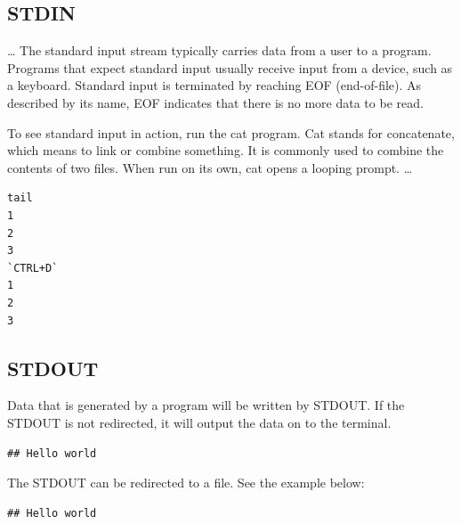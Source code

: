 \documentclass[]{book}
\makeatletter
\newenvironment{Shaded}{\begin{snugshade}}{\end{snugshade}}
\newcommand{\StringTok}[1]{\textcolor[rgb]{0.31,0.60,0.02}{#1}}
\newcommand{\CommentTok}[1]{\textcolor[rgb]{0.56,0.35,0.01}{\textit{#1}}}
\newcommand{\FunctionTok}[1]{\textcolor[rgb]{0.00,0.00,0.00}{#1}}
\newcommand{\VariableTok}[1]{\textcolor[rgb]{0.00,0.00,0.00}{#1}}
\newcommand{\OperatorTok}[1]{\textcolor[rgb]{0.81,0.36,0.00}{\textbf{#1}}}
\newcommand{\BuiltInTok}[1]{#1}
\newcommand{\NormalTok}[1]{#1}
\newenvironment{kframe}{%
\medskip{}
\setlength{\fboxsep}{.8em}
 \def\at@end@of@kframe{}%
 \ifinner\ifhmode%
  \def\at@end@of@kframe{\end{minipage}}%
  \begin{minipage}{\columnwidth}%
 \fi\fi%
 \def\FrameCommand##1{\hskip\@totalleftmargin \hskip-\fboxsep
 \colorbox{shadecolor}{##1}\hskip-\fboxsep
     \hskip-\linewidth \hskip-\@totalleftmargin \hskip\columnwidth}%
 \MakeFramed {\advance\hsize-\width
   \@totalleftmargin\z@ \linewidth\hsize
   \@setminipage}}%
 {\par\unskip\endMakeFramed%
 \at@end@of@kframe}
\renewenvironment{Shaded}{\begin{kframe}}{\end{kframe}}
\theoremstyle{definition}
\theoremstyle{definition}
\theoremstyle{definition}
\theoremstyle{remark}
\makeatother
\begin{document}
\subsection{STDIN}\label{stdin}

\ldots{} The standard input stream typically carries data from a user to
a program. Programs that expect standard input usually receive input
from a device, such as a keyboard. Standard input is terminated by
reaching EOF (end-of-file). As described by its name, EOF indicates that
there is no more data to be read.

To see standard input in action, run the cat program. Cat stands for
concatenate, which means to link or combine something. It is commonly
used to combine the contents of two files. When run on its own, cat
opens a looping prompt. \ldots{}

\begin{verbatim}
tail
1
2
3
`CTRL+D`
1
2
3
\end{verbatim}

\subsection{STDOUT}\label{stdout}

Data that is generated by a program will be written by STDOUT. If the
STDOUT is not redirected, it will output the data on to the terminal.

\begin{Shaded}
\end{Shaded}

\begin{verbatim}
## Hello world
\end{verbatim}

The STDOUT can be redirected to a file. See the example below:

\begin{Shaded}
\end{Shaded}

\begin{verbatim}
## Hello world
\end{verbatim}
\end{document}
